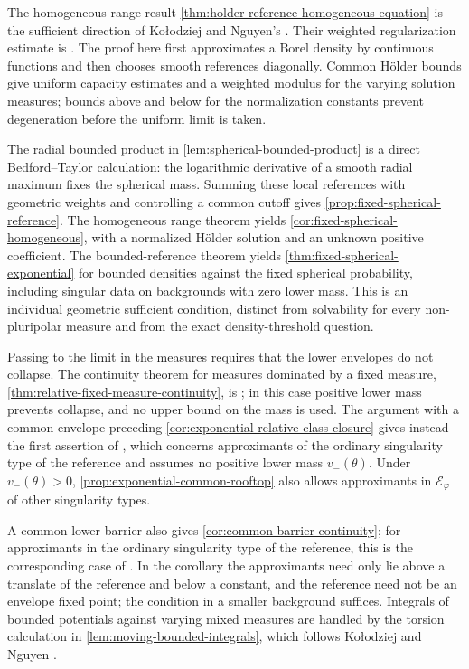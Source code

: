 The homogeneous range result \cref{thm:holder-reference-homogeneous-equation} is the sufficient direction of Ko{\l}odziej and Nguyen's \cite[Theorem~1.3, p.~2952; proof pp.~2957--2963]{KNHolder18}. Their weighted regularization estimate is \cite[Lemma~2.8, p.~2957]{KNHolder18}. The proof here first approximates a Borel density by continuous functions and then chooses smooth references diagonally. Common H\"older bounds give uniform capacity estimates and a weighted modulus for the varying solution measures; bounds above and below for the normalization constants prevent degeneration before the uniform limit is taken.

The radial bounded product in \cref{lem:spherical-bounded-product} is a direct Bedford--Taylor calculation: the logarithmic derivative of a smooth radial maximum fixes the spherical mass. Summing these local references with geometric weights and controlling a common cutoff gives \cref{prop:fixed-spherical-reference}. The homogeneous range theorem yields \cref{cor:fixed-spherical-homogeneous}, with a normalized H\"older solution and an unknown positive coefficient. The bounded-reference theorem yields \cref{thm:fixed-spherical-exponential} for bounded densities against the fixed spherical probability, including singular data on backgrounds with zero lower mass. This is an individual geometric sufficient condition, distinct from solvability for every non-pluripolar measure and from the exact density-threshold question.

Passing to the limit in the measures requires that the lower envelopes do not collapse. The continuity theorem for measures dominated by a fixed measure, \cref{thm:relative-fixed-measure-continuity}, is \cite[Lemma~4.2 and Theorem~4.1, condition~(2), p.~24]{ALS26}; in this case positive lower mass prevents collapse, and no upper bound on the mass is used. The argument with a common envelope preceding \cref{cor:exponential-relative-class-closure} gives instead the first assertion of \cite[Lemma~4.2, p.~24]{ALS26}, which concerns approximants of the ordinary singularity type of the reference and assumes no positive lower mass $v_-(\theta)$. Under $v_-(\theta)>0$, \cref{prop:exponential-common-rooftop} also allows approximants in $\mathcal E_\varphi$ of other singularity types.

A common lower barrier also gives \cref{cor:common-barrier-continuity}; for approximants in the ordinary singularity type of the reference, this is the corresponding case of \cite[Theorem~4.1, p.~24]{ALS26}. In the corollary the approximants need only lie above a translate of the reference and below a constant, and the reference need not be an envelope fixed point; the condition in a smaller background suffices. Integrals of bounded potentials against varying mixed measures are handled by the torsion calculation in \cref{lem:moving-bounded-integrals}, which follows Ko{\l}odziej and Nguyen \cite[Lemma~2.3, pp.~116--118]{KN22}.

